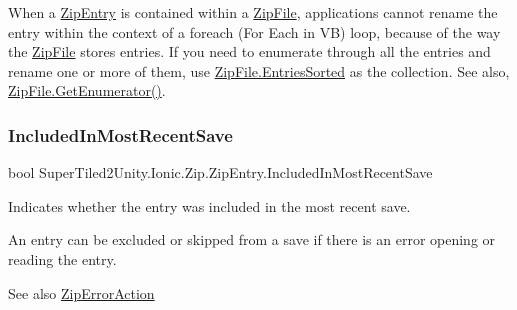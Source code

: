 When a {\ttfamily \mbox{\hyperlink{class_super_tiled2_unity_1_1_ionic_1_1_zip_1_1_zip_entry}{Zip\+Entry}}} is contained within a {\ttfamily \mbox{\hyperlink{class_super_tiled2_unity_1_1_ionic_1_1_zip_1_1_zip_file}{Zip\+File}}}, applications cannot rename the entry within the context of a {\ttfamily foreach} ({\ttfamily For Each} in VB) loop, because of the way the {\ttfamily \mbox{\hyperlink{class_super_tiled2_unity_1_1_ionic_1_1_zip_1_1_zip_file}{Zip\+File}}} stores entries. If you need to enumerate through all the entries and rename one or more of them, use \mbox{\hyperlink{class_super_tiled2_unity_1_1_ionic_1_1_zip_1_1_zip_file_ad4da87108d27a1ee534a16333fa39fd7}{Zip\+File.\+Entries\+Sorted}} as the collection. See also, \mbox{\hyperlink{class_super_tiled2_unity_1_1_ionic_1_1_zip_1_1_zip_file_ad3c41dee19a5bb1f2779ec232d3c3d0f}{Zip\+File.\+Get\+Enumerator()}}. \mbox{\label{class_super_tiled2_unity_1_1_ionic_1_1_zip_1_1_zip_entry_aaf8218fe23c2cd0c0642858ce2f85087}} 
\subsubsection{\texorpdfstring{Included\+In\+Most\+Recent\+Save}{IncludedInMostRecentSave}}
{\footnotesize\ttfamily bool Super\+Tiled2\+Unity.\+Ionic.\+Zip.\+Zip\+Entry.\+Included\+In\+Most\+Recent\+Save\hspace{0.3cm}{\ttfamily [get]}}



Indicates whether the entry was included in the most recent save. 

An entry can be excluded or skipped from a save if there is an error opening or reading the entry. 

\begin{DoxySeeAlso}{See also}
\mbox{\hyperlink{class_super_tiled2_unity_1_1_ionic_1_1_zip_1_1_zip_entry_a55a679298f00c5eef672e947c6293304}{Zip\+Error\+Action}}


\end{DoxySeeAlso}
\mbox{\label{class_super_tiled2_unity_1_1_ionic_1_1_zip_1_1_zip_entry_aef716e6024192e012aee41fe721bd7d2}} 
